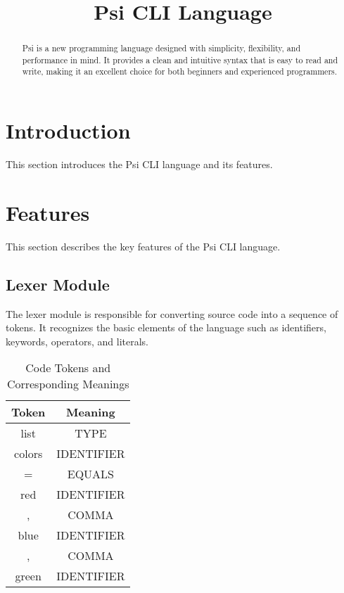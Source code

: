 \documentclass[conference]{IEEEtran}
\begin{document}
\title{Psi CLI Language}
\author{
    }
\maketitle

\begin{abstract}
    Psi is a new programming language designed with simplicity, flexibility, and performance in mind. It provides a clean and intuitive syntax that is easy to read and write, making it an excellent choice for both beginners and experienced programmers.
\end{abstract}

\section{Introduction}
This section introduces the Psi CLI language and its features.

\section{Features}
This section describes the key features of the Psi CLI language.

\subsection{Lexer Module}
The lexer module is responsible for converting source code into a sequence of tokens.
It recognizes the basic elements of the language such as identifiers, keywords, operators, and literals.

\begin{table}[htbp]
    \caption{Code Tokens and Corresponding Meanings}
    \label{table:code_tokens}
    \centering
    \begin{tabular}{@{} c|c @{}}
        \toprule
        \textbf{Token} & \textbf{Meaning} \\
        \midrule
        list           & TYPE \\
        colors         & IDENTIFIER \\
        =              & EQUALS \\
        red            & IDENTIFIER \\
        ,              & COMMA \\
        blue           & IDENTIFIER \\
        ,              & COMMA \\
        green          & IDENTIFIER \\
        \bottomrule
    \end{tabular}
\end{table}
\end{document}
